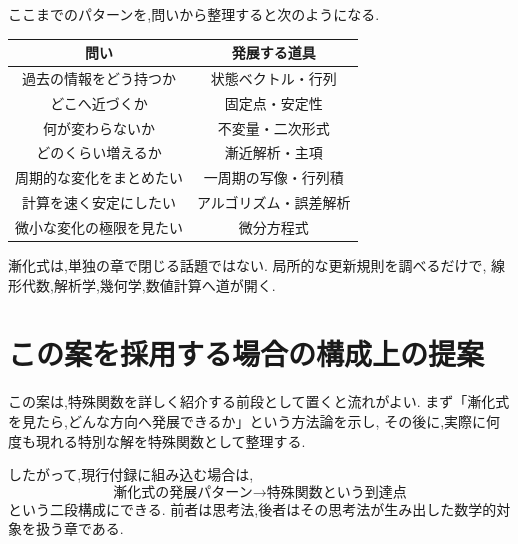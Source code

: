 ここまでのパターンを,問いから整理すると次のようになる.

\begin{center}
\begin{tabular}{c|c}
  問い & 発展する道具\\ \hline
  過去の情報をどう持つか & 状態ベクトル・行列\\
  どこへ近づくか & 固定点・安定性\\
  何が変わらないか & 不変量・二次形式\\
  どのくらい増えるか & 漸近解析・主項\\
  周期的な変化をまとめたい & 一周期の写像・行列積\\
  計算を速く安定にしたい & アルゴリズム・誤差解析\\
  微小な変化の極限を見たい & 微分方程式\\
\end{tabular}
\end{center}

漸化式は,単独の章で閉じる話題ではない.
局所的な更新規則を調べるだけで,
線形代数,解析学,幾何学,数値計算へ道が開く.

\section*{この案を採用する場合の構成上の提案}

この案は,特殊関数を詳しく紹介する前段として置くと流れがよい.
まず「漸化式を見たら,どんな方向へ発展できるか」という方法論を示し,
その後に,実際に何度も現れる特別な解を特殊関数として整理する.

したがって,現行付録に組み込む場合は,
\[
  \text{漸化式の発展パターン}
  \longrightarrow
  \text{特殊関数という到達点}
\]
という二段構成にできる.
前者は思考法,後者はその思考法が生み出した数学的対象を扱う章である.
